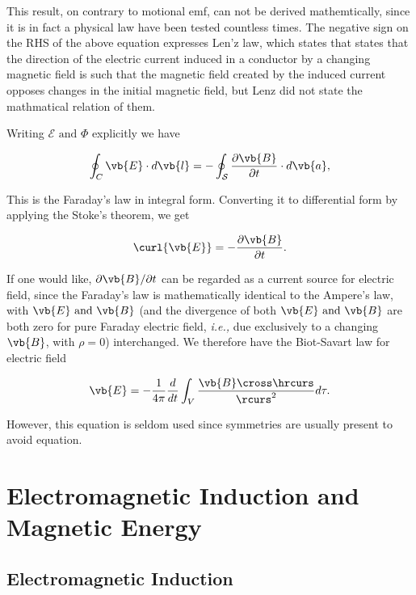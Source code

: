 \documentclass[english,a4paper,12pt]{report}
\begin{document}
This result, on contrary to motional emf, can not be derived mathemtically, since it is in fact a physical law have been tested countless times. The negative sign on the RHS of the above equation expresses Len'z law, which states that states that the direction of the electric current induced in a conductor by a changing magnetic field is such that the magnetic field created by the induced current opposes changes in the initial magnetic field, but Lenz did not state the mathmatical relation of them. 

Writing \(\mathcal{E}\text { and } \Phi \) explicitly we have

\begin{equation}
    \oint_{C}\vb{E}  \cdot d \vb{l} = -\oint_{\mathcal{S}} \frac{\partial \vb{B} }{\partial t}\cdot d \vb{a} ,  
\end{equation}

This is the Faraday's law in integral form. Converting it to differential form by applying the Stoke's theorem, we get

\begin{equation}
    \curl{\vb{E} } = -\frac{\partial \vb{B} }{\partial t}.  
\end{equation}

If one would like, \(\partial \vb{B} /\partial t\) can be regarded as a current source for electric field, since the Faraday's law is mathematically identical to the Ampere's law, with \(\vb{E} \text { and } \vb{B} \) (and the divergence of both \(\vb{E} \text { and } \vb{B} \) are both zero for pure Faraday electric field, \textit{i.e.,} due exclusively to a changing \(\vb{B} \), with \(\rho =0\)) interchanged. We therefore have the Biot-Savart law for electric field 

\begin{equation}
    \vb{E} = -\frac{1}{4\pi } \frac{d}{dt} \int_{V}^{} \frac{\vb{B} \cross \hrcurs }{\rcurs ^2} d\tau .  
\end{equation}

However, this equation is seldom used since symmetries are usually present to avoid equation.




\section{Electromagnetic Induction and Magnetic Energy}

\subsection{Electromagnetic Induction}
\end{document}
